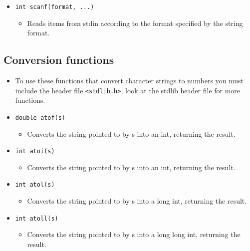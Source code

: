 \begin{itemize}
    \item \texttt{int scanf(format, ...)}
        \begin{itemize}
            \item Reads items from stdin according to the format specified by the string format. 
        \end{itemize}
\end{itemize}

\subsection{Conversion functions}
\begin{itemize}
    \item To use these functions that convert character strings to numbers you must include the header file \verb|<stdlib.h>|, look at the stdlib header file for more functions. 
    \item \texttt{double atof(s)}
        \begin{itemize}
            \item Converts the string pointed to by s into an int, returning the result.
        \end{itemize}
    
    \item \texttt{int atoi(s)}
        \begin{itemize}
            \item Converts the string pointed to by s into an int, returning the result. 
        \end{itemize}
    
    \item \texttt{int atol(s)}
        \begin{itemize}
            \item Converts the string pointed to by s into a long int, returning the result.
        \end{itemize}
    
    \item \texttt{int atoll(s)}
        \begin{itemize}
            \item Converts the string pointed to by s into a long long int, returning the result.
        \end{itemize}
\end{itemize}

